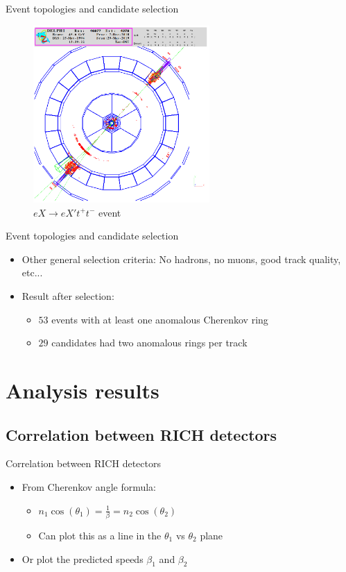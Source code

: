 \documentclass{beamer}
\begin{document}
\begin{frame}{Event topologies and candidate selection}
  \begin{figure}
    \centering
    \includegraphics[width = 0.6\textwidth]{Topology3.png}
    \caption{$eX\to eX't^+t^-$ event}
  \end{figure}
\end{frame}

\begin{frame}{Event topologies and candidate selection}
  \begin{itemize}
    \item{Other general selection criteria: No hadrons, no muons, good track quality, etc...}
    \item{Result after selection:}
    \begin{itemize}
      \item{$53$ events with at least one anomalous Cherenkov ring}
      \item{$29$ candidates had two anomalous rings per track}
    \end{itemize}
  \end{itemize}
\end{frame}

\section{Analysis results}
\subsection{Correlation between RICH detectors}
\begin{frame}{Correlation between RICH detectors}
  \begin{itemize}
    \item{From Cherenkov angle formula:}
    \begin{itemize}
      \item{$n_1\cos(\theta_1) = \frac{1}{\beta} = n_2\cos(\theta_2)$}
      \item{Can plot this as a line in the $\theta_1$ vs $\theta_2$ plane}
    \end{itemize}
    \item{Or plot the predicted speeds $\beta_1$ and $\beta_2$}
  \end{itemize}
\end{frame}
\end{document}
